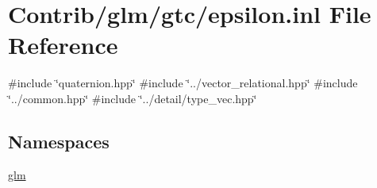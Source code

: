 \hypertarget{epsilon_8inl}{}\section{Contrib/glm/gtc/epsilon.inl File Reference}
\label{epsilon_8inl}
{\ttfamily \#include \char`\"{}quaternion.\+hpp\char`\"{}}\newline
{\ttfamily \#include \char`\"{}../vector\+\_\+relational.\+hpp\char`\"{}}\newline
{\ttfamily \#include \char`\"{}../common.\+hpp\char`\"{}}\newline
{\ttfamily \#include \char`\"{}../detail/type\+\_\+vec.\+hpp\char`\"{}}\newline
\subsection*{Namespaces}
\begin{DoxyCompactItemize}
\item 
 \mbox{\hyperlink{namespaceglm}{glm}}
\end{DoxyCompactItemize}
